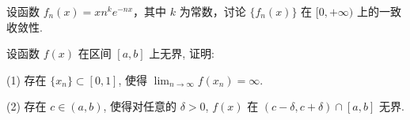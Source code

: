设函数 $f_{n}(x) = x n^{k} e^{-nx}$，其中 $k$ 为常数，讨论 $\{f_{n}(x)\}$ 在 $[0, +\infty)$ 上的一致收敛性.\par
\par{}
设函数 $f(x)$ 在区间 $[a, b]$ 上无界, 证明:\par
(1) 存在 $\{x_{n}\} \subset [0,1]$, 使得 $\lim_{n\to \infty}f(x_n) = \infty$.\par
(2) 存在 $c \in (a, b)$, 使得对任意的 $\delta > 0$, $f(x)$ 在 $(c - \delta, c + \delta) \cap [a, b]$ 无界.\par
